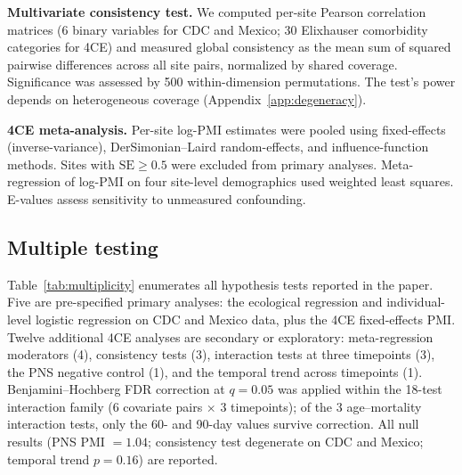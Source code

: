 \documentclass{article}
\begin{document}
\textbf{Multivariate consistency test.}  We computed per-site Pearson
correlation matrices (6 binary variables for CDC and Mexico; 30 Elixhauser
comorbidity categories for 4CE) and measured global consistency as the mean
sum of squared pairwise differences across all site pairs, normalized by
shared coverage.  Significance was assessed by 500 within-dimension
permutations.  The test's power depends on heterogeneous coverage
(Appendix~\ref{app:degeneracy}).

\textbf{4CE meta-analysis.}  Per-site log-PMI estimates were pooled using
fixed-effects (inverse-variance), DerSimonian--Laird random-effects, and
influence-function methods.  Sites with $\text{SE} \geq 0.5$ were excluded
from primary analyses.  Meta-regression of log-PMI on four site-level
demographics used weighted least squares.  E-values \cite{vanderweele2017}
assess sensitivity to unmeasured confounding.

\subsection{Multiple testing}

Table~\ref{tab:multiplicity} enumerates all hypothesis tests reported in
the paper.  Five are pre-specified primary analyses: the ecological
regression and individual-level logistic regression on CDC and Mexico data,
plus the 4CE fixed-effects PMI.  Twelve additional 4CE analyses are
secondary or exploratory: meta-regression moderators (4), consistency
tests (3), interaction tests at three timepoints (3), the PNS negative
control (1), and the temporal trend across timepoints (1).
Benjamini--Hochberg FDR correction at $q = 0.05$ was applied within
the 18-test interaction family (6 covariate pairs $\times$ 3
timepoints); of the 3 age--mortality interaction tests, only the 60-
and 90-day values survive correction.  All null results (PNS PMI
$= 1.04$; consistency test degenerate on CDC and Mexico; temporal trend
$p = 0.16$) are reported.
\end{document}
